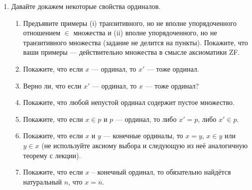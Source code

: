 \documentclass[10pt,a4paper,oneside]{article}
\begin{document}
\begin{enumerate}
\item Давайте докажем некоторые свойства ординалов.
\begin{enumerate}
\item Предъявите примеры (i) транзитивного, но не вполне упорядоченного отношением $\in$ множества и (ii) вполне упорядоченного,
но не транзитивного множества (задание не делится на пункты). Покажите, что ваши примеры --- действительно множества в смысле аксиоматики ZF.
\item Покажите, что если $x$ --- ординал, то $x'$ --- тоже ординал.
\item Верно ли, что если $x'$ --- ординал, то $x$ --- тоже ординал?
\item Покажите, что любой непустой ординал содержит пустое множество.
\item Покажите, что если $x \in p$ и $p$ --- ординал, то либо $x' = p$, либо $x' \in p$.
\item Покажите, что если $x$ и $y$ --- конечные ординалы, то $x = y$, $x \in y$ или $y \in x$ (не используйте аксиому выбора
и следующую из неё аналогичную теорему с лекции).
\item Покажите, что если $x$ -- конечный ординал, то обязательно найдётся
натуральный $n$, что $x = \overline{n}$.
\end{enumerate}
\end{enumerate}
\end{document}
